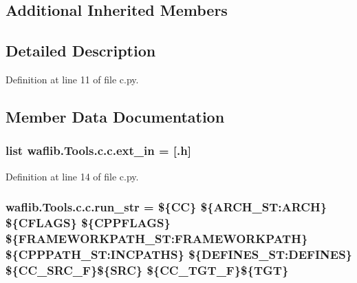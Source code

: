 \subsection*{Additional Inherited Members}


\subsection{Detailed Description}


Definition at line 11 of file c.\+py.



\subsection{Member Data Documentation}
\subsubsection[{\texorpdfstring{ext\+\_\+in}{ext_in}}]{\setlength{\rightskip}{0pt plus 5cm}list waflib.\+Tools.\+c.\+c.\+ext\+\_\+in = \mbox{[}\textquotesingle{}.h\textquotesingle{}\mbox{]}\hspace{0.3cm}{\ttfamily [static]}}\hypertarget{classwaflib_1_1_tools_1_1c_1_1c_a467da5df7e22592dc8522e604e51834b}{}\label{classwaflib_1_1_tools_1_1c_1_1c_a467da5df7e22592dc8522e604e51834b}


Definition at line 14 of file c.\+py.

\subsubsection[{\texorpdfstring{run\+\_\+str}{run_str}}]{ waflib.\+Tools.\+c.\+c.\+run\+\_\+str = \textquotesingle{}\$\{CC\} \$\{A\+R\+C\+H\+\_\+\+S\+T\+:\+A\+R\+CH\} \$\{C\+F\+L\+A\+GS\} \$\{C\+P\+P\+F\+L\+A\+GS\} \$\{F\+R\+A\+M\+E\+W\+O\+R\+K\+P\+A\+T\+H\+\_\+\+S\+T\+:\+F\+R\+A\+M\+E\+W\+O\+R\+K\+P\+A\+TH\} \$\{C\+P\+P\+P\+A\+T\+H\+\_\+\+S\+T\+:\+I\+N\+C\+P\+A\+T\+HS\} \$\{D\+E\+F\+I\+N\+E\+S\+\_\+\+S\+T\+:\+D\+E\+F\+I\+N\+ES\} \$\{C\+C\+\_\+\+S\+R\+C\+\_\+F\}\$\{S\+RC\} \$\{C\+C\+\_\+\+T\+G\+T\+\_\+F\}\$\{T\+GT\}\textquotesingle{}\hspace{0.3cm}{\ttfamily [static]}}\hypertarget{classwaflib_1_1_tools_1_1c_1_1c_a1a6b4be4617a72003ab4259bd2094812}{}\label{classwaflib_1_1_tools_1_1c_1_1c_a1a6b4be4617a72003ab4259bd2094812}


